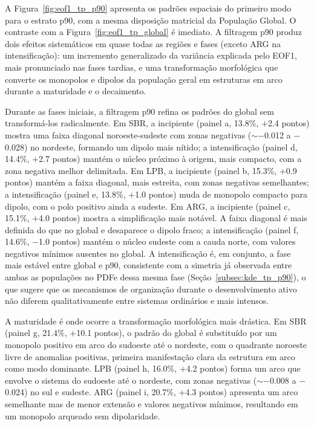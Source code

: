 A Figura~\ref{fig:eof1_tp_p90} apresenta os padrões espaciais do primeiro modo para o estrato p90, com a mesma disposição matricial da População Global. O contraste com a Figura~\ref{fig:eof1_tp_global} é imediato. A filtragem p90 produz dois efeitos sistemáticos em quase todas as regiões e fases (exceto ARG na intensificação): um incremento generalizado da variância explicada pelo EOF1, mais pronunciado nas fases tardias, e uma transformação morfológica que converte os monopolos e dipolos da população geral em estruturas em arco durante a maturidade e o decaimento.

Durante as fases iniciais, a filtragem p90 refina os padrões do global sem transformá-los radicalmente. Em SBR, a incipiente (painel a, 13.8\%, $+$2.4 pontos) mostra uma faixa diagonal noroeste-sudeste com zonas negativas ($\sim$$-$0.012 a $-$0.028) no nordeste, formando um dipolo mais nítido; a intensificação (painel d, 14.4\%, $+$2.7 pontos) mantém o núcleo próximo à origem, mais compacto, com a zona negativa melhor delimitada. Em LPB, a incipiente (painel b, 15.3\%, $+$0.9 pontos) mantém a faixa diagonal, mais estreita, com zonas negativas semelhantes; a intensificação (painel e, 13.8\%, $+$1.0 pontos) muda de monopolo compacto para dipolo, com o polo positivo ainda a sudeste. Em ARG, a incipiente (painel c, 15.1\%, $+$4.0 pontos) mostra a simplificação mais notável. A faixa diagonal é mais definida do que no global e desaparece o dipolo fraco; a intensificação (painel f, 14.6\%, $-$1.0 pontos) mantém o núcleo sudeste com a cauda norte, com valores negativos mínimos ausentes no global. A intensificação é, em conjunto, a fase mais estável entre global e p90, consistente com a simetria já observada entre ambas as populações no PDFe dessa mesma fase (Seção~\ref{subsec:kde_tp_p90}), o que sugere que os mecanismos de organização durante o desenvolvimento ativo não diferem qualitativamente entre sistemas ordinários e mais intensos.

A maturidade é onde ocorre a transformação morfológica mais drástica. Em SBR (painel g, 21.4\%, $+$10.1 pontos), o padrão do global é substituído por um monopolo positivo em arco do sudoeste até o nordeste, com o quadrante noroeste livre de anomalias positivas, primeira manifestação clara da estrutura em arco como modo dominante. LPB (painel h, 16.0\%, $+$4.2 pontos) forma um arco que envolve o sistema do sudoeste até o nordeste, com zonas negativas ($\sim$$-$0.008 a $-$0.024) no sul e sudeste. ARG (painel i, 20.7\%, $+$4.3 pontos) apresenta um arco semelhante mas de menor extensão e valores negativos mínimos, resultando em um monopolo arqueado sem dipolaridade.

